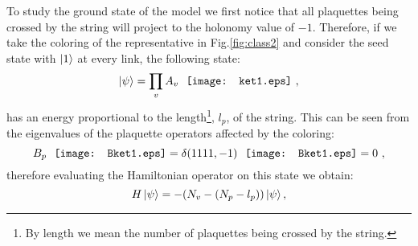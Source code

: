 \documentclass[titlepage,11pt]{article}
\theoremstyle{plain}%
\theoremstyle{definition}
\theoremstyle{remark}
\begin{document}
To study the ground state of the model we first notice that all plaquettes being crossed by the string will project to the holonomy value of \(-1\). Therefore, if we take the coloring of the representative in Fig.\ref{fig:class2} and consider the seed state with \(\ket{1}\) at every link, the following state:
\[\ket{\psi}= \prod_v A_v\ \ \vcenter{\hbox{\texttt{[image: ket1.eps]}}}\ ,\]
has an energy proportional to the length\footnote{By length we mean the number of plaquettes being crossed by the string.}, \(l_p\), of the string. This can be seen from the eigenvalues of the plaquette operators affected by the coloring:
\[B_p\ \ \vcenter{\hbox{\texttt{[image: Bket1.eps]}}} = \delta(1111,-1)\ \ \vcenter{\hbox{\texttt{[image: Bket1.eps]}}}=0\ ,\]
therefore evaluating the Hamiltonian operator on this state we obtain:
\begin{equation}\label{eq:Epsi}
H\ket{\psi}=-(N_v -(N_p - l_p))\ket{\psi},
\end{equation}
\end{document}
